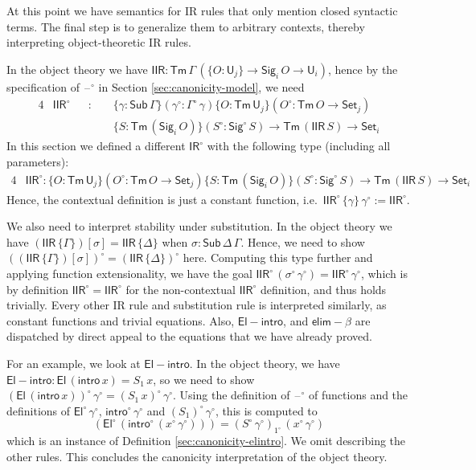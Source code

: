 \documentclass[acmsmall,screen,review,anonymous]{acmart}
\newcommand{\msf}[1]{{\mathsf{#1}}}
\newcommand{\U}{\msf{U}}
\newcommand{\Set}{\msf{Set}}
\newcommand{\El}{\msf{El}}
\newcommand{\Sig}{\msf{Sig}}
\newcommand{\blank}{{\mathord{\hspace{1pt}\text{--}\hspace{1pt}}}}
\newcommand{\IR}{\msf{IR}}
\newcommand{\intro}{\msf{intro}}
\newcommand{\elim}{\msf{elim}}
\newcommand{\IIR}{\msf{IIR}}
\newcommand{\Sub}{\msf{Sub}}
\newcommand{\Tm}{\msf{Tm}}
\newcommand{\w}{\circ}
\newcommand{\Elintro}{\msf{El\!\!-\!\!intro}}
\newcommand{\elimbeta}{\elim\!-\!\!\beta}
\begin{document}
\begin{definition}
At this point we have semantics for IR rules that only mention closed syntactic terms. The final
step is to generalize them to arbitrary contexts, thereby interpreting object-theoretic IR rules.

In the object theory we have $\IIR : \Tm\,\Gamma\,(\{O : \U_j\} \to \Sig_i\,O \to \U_i)$, hence by the specification
of $\blank^\w$ in Section \ref{sec:canonicity-model}, we need
\begin{alignat*}{4}
  & \IIR^\w &&:\,\,&& \{\gamma : \Sub\,\Gamma\}(\gamma^\w : \Gamma^\w\,\gamma)\{O : \Tm\,\U_j\}(O^\w : \Tm\,O \to \Set_j)\\
  &         &&     && \{S : \Tm\,(\Sig_i\,O)\}(S^\w : \Sig^\w\,S) \to \Tm\,(\IIR\,S) \to \Set_i
\end{alignat*}
In this section we defined a different $\IR^\w$ with the following type (including all parameters):
\begin{alignat*}{4}
  & \IIR^\w : \{O : \Tm\,\U_j\}(O^\w : \Tm\,O \to \Set_j)\{S : \Tm\,(\Sig_i\,O)\}(S^\w : \Sig^\w\,S) \to \Tm\,(\IIR\,S) \to \Set_i
\end{alignat*}
Hence, the contextual definition is just a constant function, i.e.\ $\IIR^\w\,\{\gamma\}\,\gamma^\w
:= \IIR^\w$.

We also need to interpret stability under substitution. In the object theory we have
$(\IIR\,\{\Gamma\})[\sigma] = \IIR\,\{\Delta\}$ when $\sigma : \Sub\,\Delta\,\Gamma$. Hence, we need
to show $((\IIR\,\{\Gamma\})[\sigma])^\w = (\IIR\,\{\Delta\})^\w$ here. Computing this type further
and applying function extensionality, we have the goal $\IIR^\w\,(\sigma^\w\,\gamma^\w) =
\IIR^\w\,\gamma^\w$, which is by definition $\IIR^\w = \IIR^\w$ for the non-contextual $\IIR^\w$
definition, and thus holds trivially. Every other IR rule and substitution rule is interpreted
similarly, as constant functions and trivial equations. Also, $\Elintro$, and $\elimbeta$ are
dispatched by direct appeal to the equations that we have already proved.

For an example, we look at $\Elintro$. In the object theory, we have $\Elintro : \El\,(\intro\,x) =
S_1\,x$, so we need to show $(\El\,(\intro\,x))^\w\,\gamma^\w = (S_1\,x)^\w\,\gamma^\w$. Using the
definition of $\blank^\w$ of functions and the definitions of $\El^\w\,\gamma^\w$,
$\intro^\w\,\gamma^\w$ and $(S_1)^\w\,\gamma^\w$, this is computed to
\[ (\El^\w\,(\intro^\w\,(x^\w\,\gamma^\w))) = (S^\w\,\gamma^\w)_{1^\w}\,(x^\w\,\gamma^\w) \]
which is an instance of Definition \ref{sec:canonicity-elintro}. We omit describing the other
rules. This concludes the canonicity interpretation of the object theory.

\end{definition}
\end{document}
